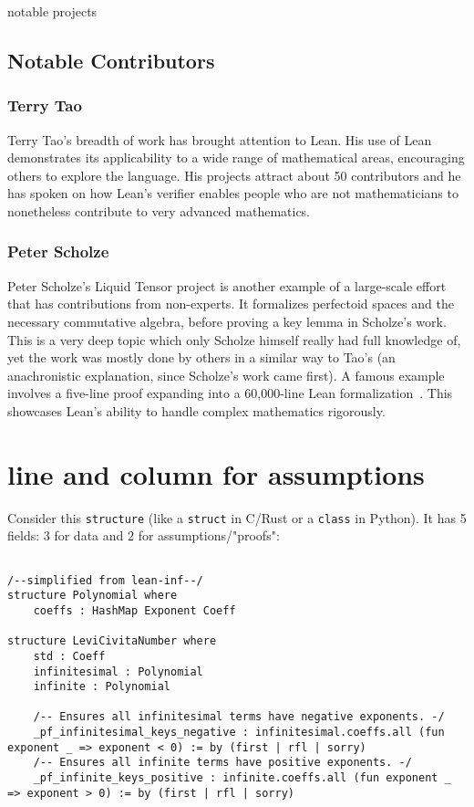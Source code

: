 \documentclass{article}
\begin{document}
notable projects


\subsection{Notable Contributors}
\subsubsection{Terry Tao}
Terry Tao's breadth of work has brought attention to Lean. His use of Lean demonstrates its applicability to a wide range of mathematical areas, encouraging others to explore the language. His projects attract about 50 contributors and he has spoken on how Lean's verifier enables people who are not mathematicians to nonetheless contribute to very advanced mathematics.

\subsubsection{Peter Scholze}
Peter Scholze's Liquid Tensor project is another example of a large-scale effort that has contributions from non-experts. It formalizes perfectoid spaces and the necessary commutative algebra, before proving a key lemma in Scholze's work. This is a very deep topic which only Scholze himself really had full knowledge of, yet the work was mostly done by others in a similar way to Tao's (an anachronistic explanation, since Scholze's work came first). A famous example involves a five-line proof expanding into a 60,000-line Lean formalization~\cite{liquid-tensor}. This showcases Lean's ability to handle complex mathematics rigorously.

\section{line and column for assumptions}

Consider this \texttt{structure} (like a \texttt{struct} in C/Rust or a \texttt{class} in Python). It has 5 fields: 3 for data and 2 for assumptions/"proofs":

\begin{verbatim}

/--simplified from lean-inf--/
structure Polynomial where
    coeffs : HashMap Exponent Coeff

structure LeviCivitaNumber where
    std : Coeff
    infinitesimal : Polynomial
    infinite : Polynomial

    /-- Ensures all infinitesimal terms have negative exponents. -/
    _pf_infinitesimal_keys_negative : infinitesimal.coeffs.all (fun exponent _ => exponent < 0) := by (first | rfl | sorry)
    /-- Ensures all infinite terms have positive exponents. -/
    _pf_infinite_keys_positive : infinite.coeffs.all (fun exponent _ => exponent > 0) := by (first | rfl | sorry)
\end{verbatim}
\end{document}
